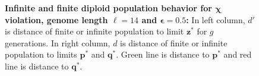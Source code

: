 \begin{figure}[h]
\begin{center}
\hspace{-3em}%
\vspace{-0.5em}  \hspace{-3em}%


\caption[\textbf{Infinite and finite diploid population behavior for $\bm{\chi}$ violation, genome length $\ell = 14$ and $\bm{\epsilon} = 0.5$}]{\textbf{Infinite and finite diploid population behavior for $\bm{\chi}$ violation, genome length $\ell = 14$ and $\bm{\epsilon} = 0.5$:} 
  In left column, $d'$ is distance of finite or infinite population to limit $\bm{z}^\ast$ for $g$ generations. In right column, $d$ is distance of finite or infinite population to limits $\bm{p}^\ast$ and $\bm{q}^\ast$. Green line is distance to $\bm{p}^\ast$ and red line is distance to $\bm{q}^\ast$.}
\label{oscillation_14d_vio_chi_0.5}
\end{center}
\end{figure}

